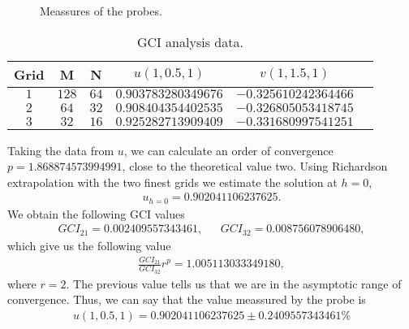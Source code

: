\begin{figure}[H]
\centering     %
{}
\caption{Meassures of the probes.}
\end{figure}


\begin{table}[H]
\centering
\begin{tabular}{c|c|c|c|c|c}
Grid  & M & N & $u(1,0.5,1)$ & $v(1,1.5,1)$ \\
\hline
$1$ & $128$ & $64$ & $0.903783280349676$& $-0.325610242364466$\\
$2$ & $64$ & $32$ & $0.908404354402535$& $-0.326805053418745$\\
$3$ & $32$ & $16$ & $0.925282713909409$& $-0.331680997541251$\\

\end{tabular}
\caption{GCI analysis data.}
\end{table}

Taking the data from $u$, we can calculate an order of convergence $p=1.868874573994991$, close to the theoretical value two. Using Richardson extrapolation with the two finest grids we estimate the solution at $h=0$,
\begin{align*}
u_{h=0}=0.902041106237625.
\end{align*}
We obtain the following GCI values
\begin{align*}
GCI_{21}=0.002409557343461,~~~~~~~GCI_{32}=0.008756078906480,
\end{align*}
which give us the following value
\begin{align*}
\frac{GCI_{21}}{GCI_{32}}r^p=1.005113033349180,
\end{align*}
where $r=2$. The previous value tells us that we are in the asymptotic range of convergence. Thus, we can say that the value meassured by the probe is
\begin{align*}
u(1,0.5,1)=0.902041106237625\pm 0.2409557343461\%
\end{align*}

